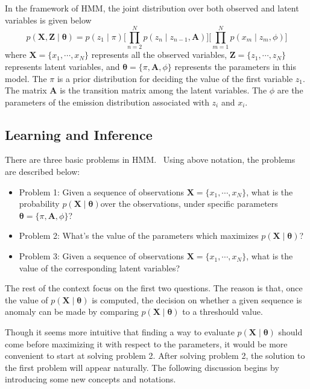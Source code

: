 In the framework of HMM, the joint distribution over both observed and latent variables is given below
\begin{equation}
	p(\mathbf{X}, \mathbf{Z} \mid \boldsymbol{\theta}) = p(z_1 \mid \pi) \big[\prod_{n=2}^{N}p(z_n\mid z_{n-1}, \mathbf{A})\big] \big[\prod_{m=1}^{N}p(x_m\mid z_m, \phi)\big]
\end{equation}
where \(\mathbf{X} = \{x_1, \cdots, x_N\}\) represents all the observed variables, \(\mathbf{Z} = \{z_1, \cdots, z_N\}\) represents latent variables, and \(\boldsymbol{\theta} = \{\pi, \mathbf{A}, \phi\}\) represents the parameters in this model. The \(\pi\) is a prior distribution for deciding the value of the first variable \(z_1\). The matrix \(\mathbf{A}\) is the transition matrix among the latent variables. The \(\phi\) are the parameters of the emission distribution associated with \(z_i\) and \(x_i\).

\subsection{Learning and Inference}
There are three basic problems in HMM.~\cite{rabiner1989tutorial} Using above notation, the problems are described below:
\begin{itemize}
	\item Problem 1: Given a sequence of observations \(\mathbf{X} = \{x_1, \cdots, x_N\}\), what is the probability \(p(\mathbf{X} \mid \boldsymbol{\theta}) 			  \)over the observations, under specific parameters \(\boldsymbol{\theta} = \{\pi, \mathbf{A}, \phi\}\)?
	\item Problem 2: What's the value of the parameters which maximizes \(p(\mathbf{X} \mid \boldsymbol{\theta})\)?
	\item Problem 3: Given a sequence of observations \(\mathbf{X} = \{x_1, \cdots, x_N\}\), what is the value of the corresponding latent variables?
\end{itemize}
The rest of the context focus on the first two questions. The reason is that, once the value of \(p(\mathbf{X} \mid \boldsymbol{\theta})\) is computed, the decision on whether a given sequence is anomaly can be made by comparing \(p(\mathbf{X} \mid \boldsymbol{\theta})\) to a threshould value.

Though it seems more intuitive that finding a way to evaluate \(p(\mathbf{X} \mid \boldsymbol{\theta})\) should come before maximizing it with respect to the parameters, it would be more convenient to start at solving problem 2. After solving problem 2, the solution to the first problem will appear naturally. The following discussion begins by introducing some new concepts and notations.

